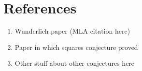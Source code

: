 \documentclass[11pt]{article}
\begin{document}
\section{References}

\begin{enumerate}
\item Wunderlich paper (MLA citation here)

\item Paper in which squares conjecture proved

\item Other stuff about other conjectures here
\end{enumerate}
\end{document}
